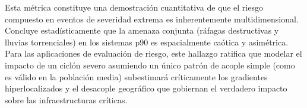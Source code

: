 Esta métrica constituye una demostración cuantitativa de que el riesgo compuesto en eventos de severidad extrema es inherentemente multidimensional. Concluye estadísticamente que la amenaza conjunta (ráfagas destructivas y lluvias torrenciales) en los sistemas p90 es espacialmente caótica y asimétrica. Para las aplicaciones de evaluación de riesgo, este hallazgo ratifica que modelar el impacto de un ciclón severo asumiendo un único patrón de acople simple (como es válido en la población media) subestimará críticamente los gradientes hiperlocalizados y el desacople geográfico que gobiernan el verdadero impacto sobre las infraestructuras críticas.
